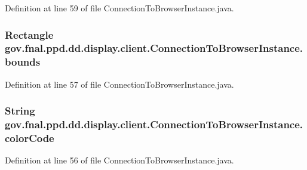 Definition at line 59 of file Connection\-To\-Browser\-Instance.\-java.

\hypertarget{classgov_1_1fnal_1_1ppd_1_1dd_1_1display_1_1client_1_1ConnectionToBrowserInstance_a770b2f3f6f6e76626e45f2d73b23bd52}{
\subsubsection[{bounds}]{\setlength{\rightskip}{0pt plus 5cm}Rectangle gov.\-fnal.\-ppd.\-dd.\-display.\-client.\-Connection\-To\-Browser\-Instance.\-bounds\hspace{0.3cm}{\ttfamily [protected]}}}\label{classgov_1_1fnal_1_1ppd_1_1dd_1_1display_1_1client_1_1ConnectionToBrowserInstance_a770b2f3f6f6e76626e45f2d73b23bd52}


Definition at line 57 of file Connection\-To\-Browser\-Instance.\-java.

\hypertarget{classgov_1_1fnal_1_1ppd_1_1dd_1_1display_1_1client_1_1ConnectionToBrowserInstance_a487fdde372e9eaafe1b9a7f83d43db23}{
\subsubsection[{color\-Code}]{\setlength{\rightskip}{0pt plus 5cm}String gov.\-fnal.\-ppd.\-dd.\-display.\-client.\-Connection\-To\-Browser\-Instance.\-color\-Code\hspace{0.3cm}{\ttfamily [protected]}}}\label{classgov_1_1fnal_1_1ppd_1_1dd_1_1display_1_1client_1_1ConnectionToBrowserInstance_a487fdde372e9eaafe1b9a7f83d43db23}


Definition at line 56 of file Connection\-To\-Browser\-Instance.\-java.

